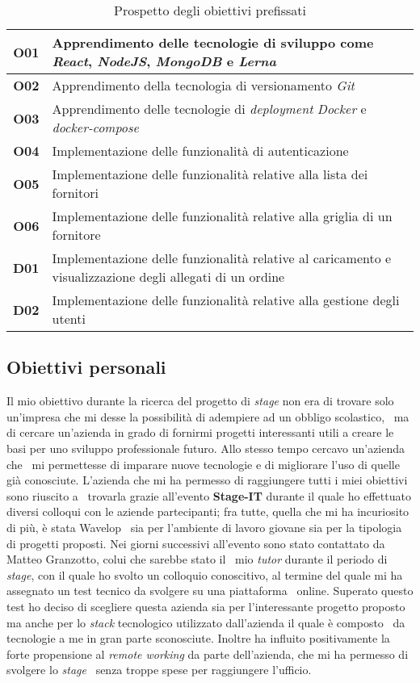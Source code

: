 \begin{center}
  \begin{table}[h]
    \begin{tabular}{ c | p{\textwidth - 40pt} }
      \textbf{O01} & Apprendimento delle tecnologie di sviluppo come \emph{React}, \emph{NodeJS}, \emph{MongoDB} e \emph{Lerna} \\ \hline
      \textbf{O02} & Apprendimento della tecnologia di versionamento \emph{Git} \\ \hline
      \textbf{O03} & Apprendimento delle tecnologie di \emph{deployment} \emph{Docker} e \emph{docker-compose} \\ \hline
      \textbf{O04} & Implementazione delle funzionalità di autenticazione \\ \hline
      \textbf{O05} & Implementazione delle funzionalità relative alla lista dei fornitori \\ \hline
      \textbf{O06} & Implementazione delle funzionalità relative alla griglia di un fornitore \\ \hline
      \textbf{D01} & Implementazione delle funzionalità relative al caricamento e visualizzazione degli allegati di un ordine \\ \hline
      \textbf{D02} & Implementazione delle funzionalità relative alla gestione degli utenti \\
    \end{tabular}
    \caption{Prospetto degli obiettivi prefissati}
  \end{table}
\end{center}

\subsection{Obiettivi personali}
Il mio obiettivo durante la ricerca del progetto di \emph{stage} non era di trovare solo un'impresa che mi desse la possibilità di adempiere ad un obbligo scolastico, \
ma di cercare un'azienda in grado di fornirmi progetti interessanti utili a creare le basi per uno sviluppo professionale futuro. Allo stesso tempo cercavo un'azienda che \
mi permettesse di imparare nuove tecnologie e di migliorare l'uso di quelle già conosciute. L'azienda che mi ha permesso di raggiungere tutti i miei obiettivi sono riuscito a \
trovarla grazie all'evento \textbf{Stage-IT} durante il quale ho effettuato diversi colloqui con le aziende partecipanti; fra tutte, quella che mi ha incuriosito di più, è stata Wavelop \
sia per l'ambiente di lavoro giovane sia per la tipologia di progetti proposti. Nei giorni successivi all'evento sono stato contattato da Matteo Granzotto, colui che sarebbe stato il \
mio \emph{tutor} durante il periodo di \emph{stage}, con il quale ho svolto un colloquio conoscitivo, al termine del quale mi ha assegnato un test tecnico da svolgere su una piattaforma \
online. Superato questo test ho deciso di scegliere questa azienda sia per l'interessante progetto proposto ma anche per lo \emph{stack} tecnologico utilizzato dall'azienda il quale è composto \
da tecnologie a me in gran parte sconosciute. Inoltre ha influito positivamente la forte propensione al \emph{remote working} da parte dell'azienda, che mi ha permesso di svolgere lo \emph{stage} \
senza troppe spese per raggiungere l'ufficio.


